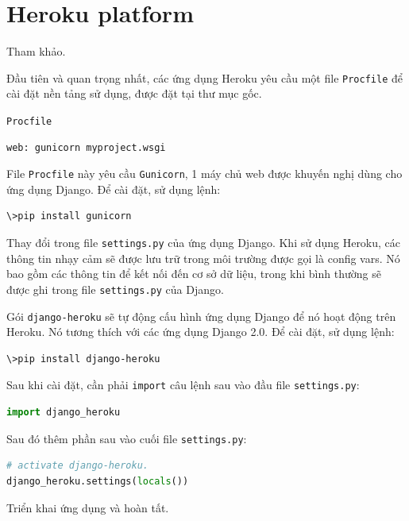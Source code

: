 \section{Heroku platform}
Tham khảo\cite{heroku}.
\par
Đầu tiên và quan trọng nhất, các ứng dụng Heroku yêu cầu một file \texttt{Procfile} để cài đặt nền tảng sử dụng, được đặt tại thư mục gốc.
\par
\texttt{Procfile}
\begin{lstlisting}[language=sh]
web: gunicorn myproject.wsgi
\end{lstlisting}
\par
File \texttt{Procfile} này yêu cầu \texttt{Gunicorn}, 1 máy chủ web được khuyến nghị dùng cho ứng dụng Django. Để cài đặt, sử dụng lệnh:
\begin{lstlisting}[language=bash]
\>pip install gunicorn
\end{lstlisting}
\par
Thay đổi trong file \texttt{settings.py} của ứng dụng Django. Khi sử dụng Heroku, các thông tin nhạy cảm sẽ được lưu trữ trong môi trường được gọi là config vars. Nó bao gồm các thông tin để kết nối đến cơ sở dữ liệu, trong khi bình thường sẽ được ghi trong file \texttt{settings.py} của Django.
\par
Gói \texttt{django-heroku} sẽ tự động cấu hình ứng dụng Django để nó hoạt động trên Heroku. Nó tương thích với các ứng dụng Django 2.0. Để cài đặt, sử dụng lệnh:
\begin{lstlisting}[language=bash]
\>pip install django-heroku
\end{lstlisting}
\par
Sau khi cài đặt, cần phải \texttt{import} câu lệnh sau vào đầu file \texttt{settings.py}:
\begin{lstlisting}[language=Python]
import django_heroku
\end{lstlisting}
\par
Sau đó thêm phần sau vào cuối file \texttt{settings.py}:
\begin{lstlisting}[language=Python]
# activate django-heroku.
django_heroku.settings(locals())
\end{lstlisting}
\par
Triển khai ứng dụng và hoàn tất.
